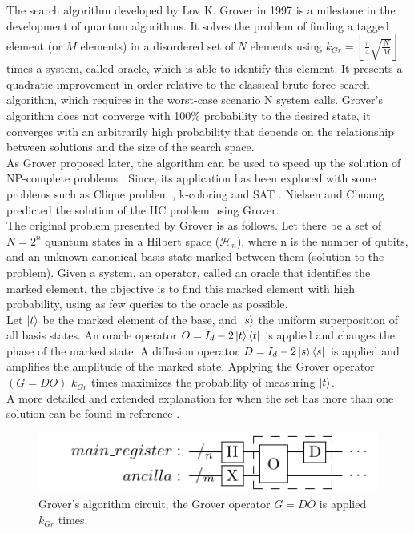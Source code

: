 \documentclass[10pt,a4paper]{article}
\begin{document}
The search algorithm developed by Lov K. Grover in 1997 \cite{Grover1} is a milestone in the development of quantum algorithms. It solves the problem of finding a tagged element (or $M$ elements) in a disordered set of $N$ elements using $k_{Gr}= \left\lfloor\frac{\pi}{4} \sqrt{\frac{N}{M}}\right\rfloor$ times a system, called oracle, which is able to identify this element. It presents a quadratic improvement in order relative to the classical brute-force search algorithm, which requires in the worst-case scenario N system calls. Grover's algorithm does not converge with 100\% probability to the desired state, it converges with an arbitrarily high probability that depends on the relationship between solutions and the size of the search space.\\
As Grover proposed later, the algorithm can be used to speed up the solution of NP-complete problems \cite{Grover2}. Since, its application has been explored with some problems such as Clique problem \cite{Clique, Clique2}, k-coloring \cite{Coloring1, Coloring2} and SAT \cite{SAT_ions, SAT_paralel}. Nielsen and Chuang predicted the solution of the HC problem using Grover\cite{Nielsen_Chuang_2010}.\\
The original problem presented by Grover \cite{Grover1} is as follows. Let there be a set of $N = 2^n$ quantum states in a Hilbert space ($\mathcal{H}_n$), where n is the number of qubits, and an unknown canonical basis state marked between them (solution to the problem). Given a system, an operator, called an oracle that identifies the marked element, the objective is to find this marked element with high probability, using as few queries to the oracle as possible.\\
Let $\ket{t}$ be the marked element of the base, and $\ket{s}$ the uniform superposition of all basis states. An oracle operator $O = I_d - 2\ket{t}\bra{t}$ is applied and changes the phase of the marked state. A diffusion operator $D = I_d - 2\ket{s}\bra{s}$ is applied and amplifies the amplitude of the marked state. Applying the Grover operator $(G=DO)$ $k_{Gr}$ times maximizes the probability of measuring $\ket{t}$.\\
A more detailed and extended explanation for when the set has more than one solution can be found in reference \cite{Nielsen_Chuang_2010}.

\begin{figure}[hbtp]
\centering
\includegraphics[scale=1.5]{figures/grover.pdf}
\caption{Grover's algorithm circuit, the Grover operator $G = DO$ is applied $k_{Gr}$ times.}
\end{figure}
\end{document}
